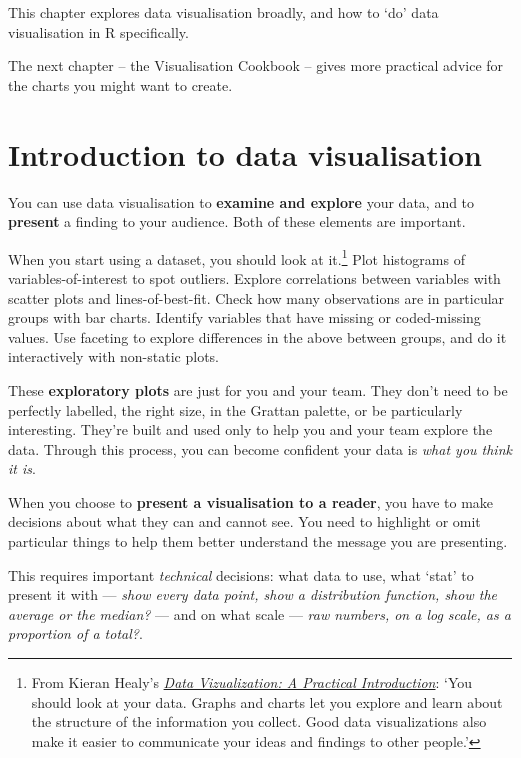 \documentclass[]{book}
\let\rmarkdownfootnote\footnote%
\def\footnote{\protect\rmarkdownfootnote}
\begin{document}
This chapter explores data visualisation broadly, and how to `do' data visualisation in R specifically.

The next chapter -- the Visualisation Cookbook -- gives more practical advice for the charts you might want to create.

\hypertarget{introduction-to-data-visualisation}{%
\section{Introduction to data visualisation}\label{introduction-to-data-visualisation}}

You can use data visualisation to \textbf{examine and explore} your data, and to \textbf{present} a finding to your audience. Both of these elements are important.

When you start using a dataset, you should look at it.\footnote{From Kieran Healy's \href{https://socviz.co/}{\emph{Data Vizualization: A Practical Introduction}}: `You should look at your data. Graphs and charts let you explore and learn about the structure of the information you collect. Good data visualizations also make it easier to communicate your ideas and findings to other people.'} Plot histograms of variables-of-interest to spot outliers. Explore correlations between variables with scatter plots and lines-of-best-fit. Check how many observations are in particular groups with bar charts. Identify variables that have missing or coded-missing values. Use faceting to explore differences in the above between groups, and do it interactively with non-static plots.

These \textbf{exploratory plots} are just for you and your team. They don't need to be perfectly labelled, the right size, in the Grattan palette, or be particularly interesting.
They're built and used only to help you and your team explore the data.
Through this process, you can become confident your data is \emph{what you think it is}.

When you choose to \textbf{present a visualisation to a reader}, you have to make decisions about what they can and cannot see. You need to highlight or omit particular things to help them better understand the message you are presenting.

This requires important \emph{technical} decisions: what data to use, what `stat' to present it with --- \emph{show every data point, show a distribution function, show the average or the median?} --- and on what scale --- \emph{raw numbers, on a log scale, as a proportion of a total?}.
\end{document}
